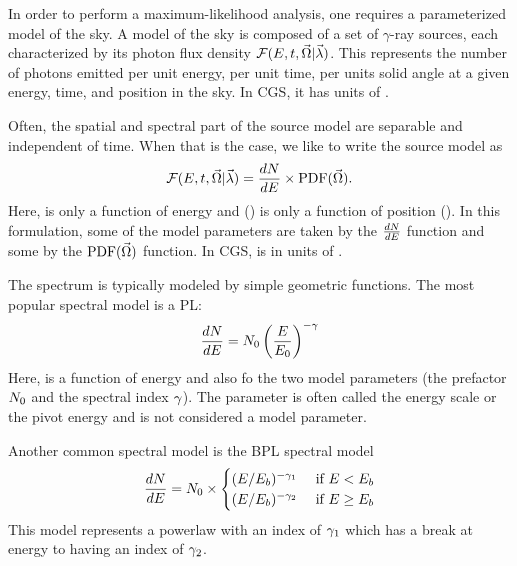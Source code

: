 
In order to perform a maximum-likelihood analysis, one requires
a parameterized model of the sky. A model of the sky
is composed of a set of $\gamma$-ray sources,
each characterized by its photon flux density 
  $\mathcal{F}(E,t,\vec\Omega|\vec\lambda)$.
This represents
the number of photons emitted per unit energy, per unit
time, per units solid angle
at a given energy, time, and position in the sky.
In \gls{CGS}, it has units of \fluxdensityunits.

Often, the spatial and spectral part of the source model
are separable and independent of time. When that is the case,
we like to write the source model as
\begin{equation}
  \mathcal{F}(E,t,\vec\Omega|\vec\lambda) = \frac{dN}{dE} \times \text{PDF}(\vec\Omega).
\end{equation}
Here, \dnde is only a function of energy and \pdf(\solidangle) is only
a function of position (\solidangle).  In this formulation, some of the
model parameters \modelparams are taken by the $\frac{dN}{dE}$ function and some
by the $\text{PDF}(\vec\Omega)$ function.
In \gls{CGS}, \dnde is in units of \prefunits.

The spectrum \dnde is typically modeled by simple geometric functions.
The most popular spectral model is a \gls{PL}:
\begin{equation}
  \frac{dN}{dE} = N_0 \left(\frac{E}{E_0}\right)^{-\gamma}
\end{equation}
Here, \dnde is a function of energy and also fo the two model parameters
(the prefactor $N_0$ and the spectral index $\gamma$). The
parameter \Escale is often called the energy scale or the pivot
energy and is not considered a model parameter.

Another common spectral model is the \gls{BPL} spectral model
\begin{equation}
  \frac{dN}{dE} = N_0 \times
    \begin{cases}
      (E/E_b)^{-\gamma_1} &\text{ if }E<E_b \\
      (E/E_b)^{-\gamma_2} &\text{ if }E\ge E_b
    \end{cases}
\end{equation}
This model represents a powerlaw with an index 
of $\gamma_1$ which has a break at energy \Ebreak
to having an index of $\gamma_2$.

